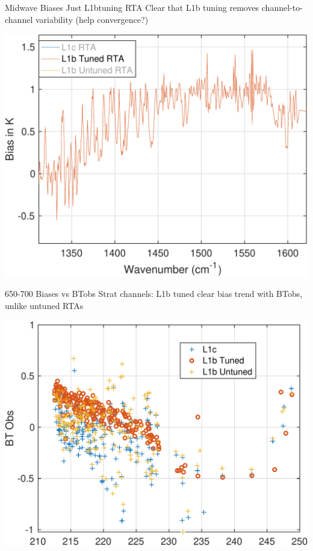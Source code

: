 \documentclass[10pt,t]{beamer}
\begin{document}
\begin{frame}[label={sec:org22ce356}]{Midwave Biases Just L1btuning RTA}
Clear that L1b tuning removes channel-to-channel variability (help convergence?)
\begin{center}
\includegraphics[width=0.75\linewidth]{./bias_3rta_mw_justL1btuning.pdf}
\end{center}
\end{frame}
\begin{frame}[label={sec:org047c8ba}]{650-700 \wn Biases vs BTobs}
Strat channels: L1b tuned clear bias trend with BTobs, unlike untuned RTAs
\begin{center}
\includegraphics[width=0.75\linewidth]{./bias_vs_btobs_650-700.pdf}
\end{center}
\end{frame}
\end{document}
